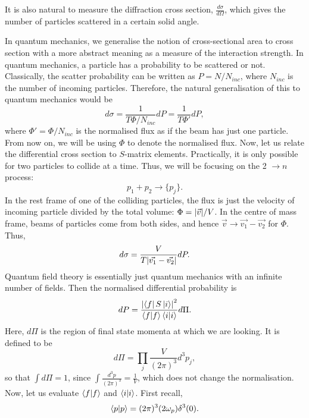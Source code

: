 \documentclass[11pt]{article}
\theoremstyle{definition}
\begin{document}
It is also natural to measure the diffraction cross section, $\frac{d\sigma}{d\Omega}$, which gives the number of particles scattered in a certain solid angle. 

In quantum mechanics, we generalise the notion of cross-sectional area to cross section with a more abstract meaning as a measure of the interaction strength. In quantum mechanics, a particle has a probability to be scattered or not. Classically, the scatter probability can be written as $P = N/N_{inc}$, where $N_{inc}$ is the number of incoming particles. Therefore, the natural generalisation of this to quantum mechanics would be
\begin{equation}
    d\sigma = \frac{1}{T\Phi/N_{inc}}dP=\frac{1}{T\Phi'}dP,
\end{equation}
where $\Phi'=\Phi/N_{inc}$ is the normalised flux as if the beam has just one particle. From now on, we will be using $\Phi$ to denote the normalised flux.
Now, let us relate the differential cross section to $S$-matrix elements. Practically, it is only possible for two particles to collide at a time. Thus, we will be focusing on the 2 $\rightarrow n$ process:
\begin{equation}
    p_1 + p_2 \rightarrow \{p_j\}.
\end{equation}
In the rest frame of one of the colliding particles, the flux is just the velocity of incoming particle divided by the total volume: $\Phi = \abs{\vec{v}}/V$. In the centre of mass frame, beams of particles come from both sides, and hence $\vec{v} \rightarrow \vec{v_1}- \vec{v_2}$ for $\Phi$. Thus, 
\begin{equation}
    d\sigma = \frac{V}{T\abs{\vec{v_1} - \vec{v_2}}} dP.
\end{equation}
Quantum field theory is essentially just quantum mechanics with an infinite number of fields. Then the  normalised differential probability is 
\begin{equation}
    dP = \frac{\abs{\bra{f}S\ket{i}}^2}{\braket{f}{f}\braket{i}{i}}d\Pi.
\end{equation}
Here, $d\Pi$ is the region of final state momenta at which we are looking. It is defined to be
\begin{equation}
    d\Pi = \prod_j \frac{V}{(2\pi)^3}d^3p_j,
    \label{Eq. dPi}
\end{equation}
so that $\int d\Pi = 1$, since $\int \frac{d^3p}{(2\pi)^3} = \frac{1}{V}$, which does not change the normalisation.
Now, let us evaluate $\braket{f}{f}$ and $\braket{i}{i}$. First recall,
\begin{equation}
    \braket{p}{p}= (2\pi)^3(2\omega_p)\delta^3(0).
\end{equation}
\end{document}
